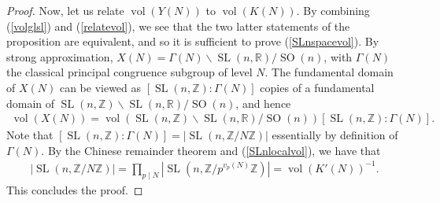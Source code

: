 \documentclass[10pt,a4paper]{amsart}
\newcommand{\R}{\mathbb{R}}
\newcommand{\SL}{\operatorname{SL}}
\newcommand{\SO}{\operatorname{SO}}
\newcommand{\Z}{\mathbb{Z}}
\newcommand{\vol}{\operatorname{vol}}
\begin{document}
\begin{proof}
Now, let us relate $\vol(Y(N))$ to $\vol(K(N))$. By combining (\ref{volglsl}) and (\ref{relatevol}), we see that the two latter statements of the proposition are equivalent, and so it is sufficient to prove (\ref{SLnspacevol}). By strong approximation, $X(N) =\Gamma(N)\backslash\SL(n,\R)/\SO(n)$, with $\Gamma(N)$ the classical principal congruence subgroup of level $N$. The fundamental domain of $X(N)$ can be viewed as $[\SL(n,\Z):\Gamma(N)]$ copies of a fundamental domain of $\SL(n,\Z)\backslash \SL(n,\R)/\SO(n)$, and hence
\begin{align*}
    \vol(X(N)) = \vol(\SL(n,\Z)\backslash \SL(n,\R)/\SO(n))[\SL(n,\Z):\Gamma(N)].
\end{align*}
Note that $[\SL(n,\Z):\Gamma(N)] = |\SL(n,\Z/N\Z)|$ essentially by definition of $\Gamma(N)$. By the Chinese remainder theorem and (\ref{SLnlocalvol}), we have that
\begin{align*}
    |\SL(n,\Z/N\Z)| = \prod_{p\mid N}|\SL(n,\Z/p^{v_p(N)}\Z)| = \vol(K'(N))^{-1}.
\end{align*}
This concludes the proof.
\end{proof}
\end{document}
